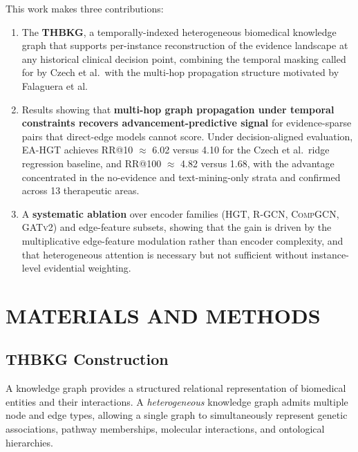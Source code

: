 \documentclass[a4,center]{NAR}
\newcommand{\hgt}{\textsc{HGT}}
\newcommand{\gatv}{\textsc{GATv2}}
\newcommand{\rgcn}{\textsc{R-GCN}}
\newcommand{\compgcn}{\textsc{CompGCN}}
\newcommand{\eahgt}{\textsc{EA-HGT}}
\begin{document}
{This work makes three contributions:
\begin{enumerate}
\item The \textbf{THBKG}, a temporally-indexed heterogeneous biomedical
knowledge graph that supports per-instance reconstruction of the evidence
landscape at any historical clinical decision point, combining the
temporal masking called for by Czech et al.\ with the multi-hop
propagation structure motivated by Falaguera et al.

\item Results showing that \textbf{multi-hop graph propagation under
temporal constraints recovers advancement-predictive signal} for
evidence-sparse pairs that direct-edge models cannot score. Under
decision-aligned evaluation, \eahgt{} achieves RR@10 $\approx$ 6.02
versus 4.10 for the Czech et al.\ ridge regression baseline, and
RR@100 $\approx$ 4.82 versus 1.68, with the advantage concentrated in
the no-evidence and text-mining-only strata and confirmed across 13
therapeutic areas.

\item A \textbf{systematic ablation} over encoder families
(\hgt{}, \rgcn{}, \compgcn{}, \gatv{}) and edge-feature subsets,
showing that the gain is driven by the multiplicative edge-feature
modulation rather than encoder complexity, and that heterogeneous
attention is necessary but not sufficient without instance-level
evidential weighting.
\end{enumerate}


\section{MATERIALS AND METHODS}

\subsection{THBKG Construction}
\label{sec:thbkg_construction}

A knowledge graph provides a structured relational representation of
biomedical entities and their interactions. A \emph{heterogeneous}
knowledge graph admits multiple node and edge types, allowing a single
graph to simultaneously represent genetic associations, pathway
memberships, molecular interactions, and ontological hierarchies.

}
\end{document}
